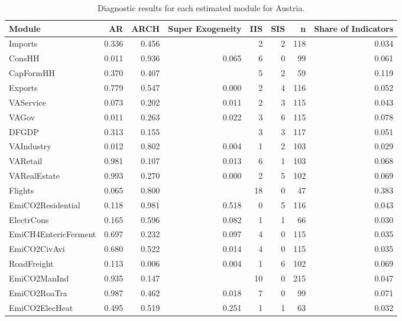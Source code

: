 \begin{table}
\centering
\caption{\label{tab:AT_diagnostics}Diagnostic results for each estimated module for Austria.}
\centering
\begin{tabular}[t]{lrrrrrrr}
\toprule
Module & AR & ARCH & Super Exogeneity & IIS & SIS & n & Share of Indicators\\
\midrule
Imports & 0.336 & 0.456 &  & 2 & 2 & 118 & 0.034\\
ConsHH & 0.011 & 0.936 & 0.065 & 6 & 0 & 99 & 0.061\\
CapFormHH & 0.370 & 0.407 &  & 5 & 2 & 59 & 0.119\\
Exports & 0.779 & 0.547 & 0.000 & 2 & 4 & 116 & 0.052\\
VAService & 0.073 & 0.202 & 0.011 & 2 & 3 & 115 & 0.043\\
\addlinespace
VAGov & 0.011 & 0.263 & 0.022 & 3 & 6 & 115 & 0.078\\
DFGDP & 0.313 & 0.155 &  & 3 & 3 & 117 & 0.051\\
VAIndustry & 0.012 & 0.802 & 0.004 & 1 & 2 & 103 & 0.029\\
VARetail & 0.981 & 0.107 & 0.013 & 6 & 1 & 103 & 0.068\\
VARealEstate & 0.993 & 0.270 & 0.000 & 2 & 5 & 102 & 0.069\\
\addlinespace
Flights & 0.065 & 0.800 &  & 18 & 0 & 47 & 0.383\\
EmiCO2Residential & 0.118 & 0.981 & 0.518 & 0 & 5 & 116 & 0.043\\
ElectrCons & 0.165 & 0.596 & 0.082 & 1 & 1 & 66 & 0.030\\
EmiCH4EntericFerment & 0.697 & 0.232 & 0.097 & 4 & 0 & 115 & 0.035\\
EmiCO2CivAvi & 0.680 & 0.522 & 0.014 & 4 & 0 & 115 & 0.035\\
\addlinespace
RoadFreight & 0.113 & 0.006 & 0.004 & 1 & 6 & 102 & 0.069\\
EmiCO2ManInd & 0.935 & 0.147 &  & 10 & 0 & 215 & 0.047\\
EmiCO2RoaTra & 0.987 & 0.462 & 0.018 & 7 & 0 & 99 & 0.071\\
EmiCO2ElecHeat & 0.495 & 0.519 & 0.251 & 1 & 1 & 63 & 0.032\\
\bottomrule
\end{tabular}
\end{table}
